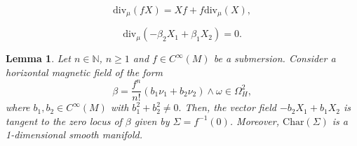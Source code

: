 \documentclass[10pt,a4paper]{amsart}
\newtheorem{lemma}{Lemma}
\newcommand{\B}{\beta}
\newcommand{\diff}{d}%
\newcommand{\red}{\color{red}}
\begin{document}
\begin{equation}
\label{leibniz}
\mathrm{div}_\mu(fX)=Xf+f\mathrm{div}_\mu(X),
\end{equation}

\begin{equation}
\label{eq:maxwell}
	\mathrm{div}_{\mu}(-\B_2X_1+\B_1X_2)=0.
\end{equation}

\begin{lemma}
\label{lem:example}
Let $n\in\mathbb{N}$, $n\geq 1$ and $f\in C^{\infty}(M)$ be a submersion. Consider a horizontal magnetic field of the form
\begin{equation}
\B=\frac{f^n}{n!}(b_1\nu_1+b_2\nu_2)\wedge\omega\in \Omega^2_H,
\end{equation}
where $b_1,b_2\in C^\infty(M)$ with  $b_1^2+b_2^2 \neq 0.$
Then, the vector field $-b_2X_1+b_1X_2$ is tangent to the zero locus of $\B$ given by $\Sigma=f^{-1}(0)$.
Moreover, $\mathrm{Char}(\Sigma)$ is a 1-dimensional smooth manifold.
\end{lemma}
\end{document}
